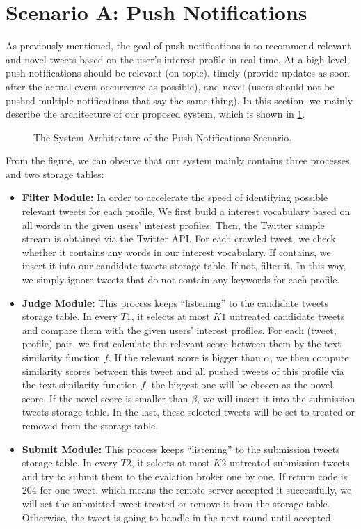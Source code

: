\section{Scenario A: Push Notifications}
As previously mentioned, the goal of push notifications is to recommend relevant and
novel tweets based on the user’s interest profile in real-time.
At a high level, push notifications should be relevant (on topic),
timely (provide updates as soon after the actual event occurrence as possible),
and novel (users should not be pushed multiple notifications that say the same thing).
In this section, we mainly describe the architecture of our proposed system, which is shown in \ref{fig:a}.

\begin{figure}[htbp]
\caption{The System Architecture of the Push Notifications Scenario.}
\label{fig:a}
\end{figure}

From the figure, we can observe that our system mainly contains three processes and two storage tables:

\begin{itemize}
\item \textbf{Filter Module:} 
In order to accelerate the speed of identifying possible relevant tweets for each profile,
We first build a interest vocabulary based on all words in the given users' interest profiles.
Then, the Twitter sample stream is obtained via the Twitter API.
For each crawled tweet, we check whether it contains any words in our interest vocabulary.
If contains, we insert it into our candidate tweets storage table. If not, filter it.
In this way, we simply ignore tweets that do not contain any keywords for each profile.

\item \textbf{Judge Module:}
This process keeps ``listening'' to the candidate tweets storage table.
In every $T1$, it selects at most $K1$ untreated candidate tweets and compare them with the given users' interest profiles.
For each (tweet, profile) pair, we first calculate the relevant score between them by the text similarity function $f$.
If the relevant score is bigger than $\alpha$, we then compute similarity scores between this tweet and all pushed tweets of this profile
via the text similarity function $f$, the biggest one will be chosen as the novel score.
If the novel score is smaller than $\beta$, we will insert it into the submission tweets storage table.
In the last, these selected tweets will be set to treated or removed from the storage table.

\item \textbf{Submit Module:}
This process keeps ``listening'' to the submission tweets storage table.
In every $T2$, it selects at most $K2$ untreated submission tweets and try to submit them to the evalation broker one by one.
If return code is $204$ for one tweet, which means the remote server accepted it successfully,
we will set the submitted tweet treated or remove it from the storage table.
Otherwise, the tweet is going to handle in the next round until accepted.
\end{itemize}

